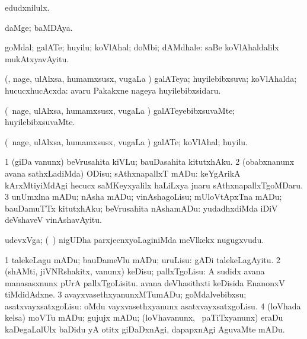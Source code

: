 {{\bentry
{} 
\gl{\akirx}
\bmng
edudxnilulx. 
\emng
\eentry

\bentry
{} 
\gl{\nA}
\expl{}
\bmng
daMge; baMDAya. 
\emng
\eentry

\bentry
{} 
\gl{\nA}
\expl{}
\bmng
goMdal; galATe; huyilu; koVlAhal; doMbi; dAMdhale:  saBe koVlAhaldalilx mukAtxyavAyitu. 
\emng
\eentry

\bentry
{} 
\gl{\nA}
\expl{}
\bmng
(\kanmu, nage, ulAlxsa, humamxsusx, \mo vugaLa \vi) galATeya; huyilebibxsuva; koVlAhalda; hucucxhucAcxda:  avaru Pakakxne nageya huyilebibxsidaru. 
\emng
\eentry

\bentry
{} 
\gl{\kirxvi}
\expl{}
\bmng
(\kanmu\ nage, ulAlxsa, humamxsusx, \mo vugaLa \vi) galATeyebibxsuvaMte; huyilebibxsuvaMte. 
\emng
\eentry

\bentry
{} 
\gl{\nA}
\expl{}
\bmng
(\kanmu\ nage, ulAlxsa, humamxsusx, \mo vugaLa \vi) galATe; koVlAhal; huyilu. 
\emng
\eentry

\bentry
{} 
\gl{\sakirx}
\expl{}
\bmng
\bnum
\num{1} (giDa \mo vanunx) beVrusahita kiVLu; bauDasahita kitutxhAku. 
\num{2} (obabxnanunx avana sathxLadiMda) ODisu; sAthxnapallxT mADu:  keYgArikA kArxMtiyiMdAgi hecucx saMKeyxyalilx haLiLxya jnaru sAthxnapallxTgoMDaru. 
\num{3} unUmxlna mADu; nAsha mADu; vinAshagoLisu; mUloVtApxTna mADu; bauDamuTTx kitutxhAku; beVrusahita nAshamADu:  yudadhxdiMda iDiV deVshaveV vinAshavAyitu. 
\enum
\emng
\eentry

\bentry
{} 
\gl{\nA}
\expl{}
\bmng
udevxVga; (\kanmu\ \mavi) nigUDha parxjecnxyoLaginiMda meVlkekx nugugxvudu. 
\emng
\eentry

\bentry
{} 
\gl{\BAavayx}
\expl{}
\bmng
{} 
\emng
\eentry

\bentry
{} 
\gl{\kirx}


\noindent
\gl{\sakirx}
\bmng
\bnum
\num{1} talekeLagu mADu; bauDameVlu mADu; uruLisu:  gADi talekeLagAyitu. 
\num{2} (shAMti, jiVNRshakitx, \mo vanunx) keDisu; pallxTgoLisu:  A sudidx avana manasasxnunx pUrA pallxTgoLisitu.  avana deVhasithxti keDisida EnanonxV tiMdidAdxne. 
\num{3} avayxvasethxyanunxMTumADu; goMdalvebibxsu; asatxvayxsatxgoLisu:  oMdu vayxvasethxyanunx asatxvayxsatxgoLisu. 
\num{4} (loVhada kelsa) moVTu mADu; gujujx mADu; (loVhavanunx, \kanmu\ paTiTxyanunx) eraDu kaDegaLalUlx baDidu yA otitx giDaDxnAgi, dapapxnAgi AguvaMte mADu. 
\enum
\emng

}}
